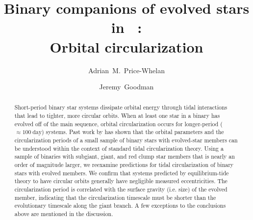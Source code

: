 \documentclass[modern, letterpaper]{aastex62}
\newcommand{\apogee}{\project{\acronym{APOGEE}}}
\newcommand{\DR}{\acronym{DR14}}
\begin{document}
\sloppy\sloppypar\raggedbottom\frenchspacing %

\title{Binary companions of evolved stars in \apogee\ \DR: \\
       Orbital circularization}

\author[0000-0003-0872-7098]{Adrian~M.~Price-Whelan}

\author[0000-0002-6710-7748]{Jeremy~Goodman}



\begin{abstract}\noindent %
Short-period binary star systems dissipate orbital energy through tidal
interactions that lead to tighter, more circular orbits.
When at least one star in a binary has evolved off of the main sequence, orbital
circularization occurs for longer-period ($\approx 100~\textrm{day}$) systems.
Past work by \citet{Verbunt:1995} has shown that the orbital parameters and the
circularization periods of a small sample of binary stars with evolved-star
members can be understood within the context of standard tidal circularization
theory.
Using a sample of binaries with subgiant, giant, and red clump star members that
is nearly an order of magnitude larger, we reexamine predictions for tidal
circularization of binary stars with evolved members.
We confirm that systems predicted by equilibrium-tide theory to have circular
orbits generally have negligible measured eccentricities.
The circularization period is correlated with the surface gravity (i.e. size) of
the evolved member, indicating that the circularization timescale must be
shorter than the evolutionary timescale along the giant branch.
A few exceptions to the conclusions above are mentioned in the discussion.

\end{abstract}
\end{document}
